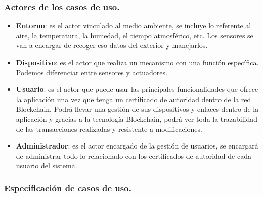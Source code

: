 \subsubsection{Actores de los casos de uso.}

\begin{itemize}
    \item \textbf{Entorno}: es el actor vinculado al medio ambiente, se incluye lo referente al aire, la temperatura, la humedad,
    el tiempo atmosférico, etc. Los sensores se van a encargar de recoger eso datos del exterior y manejarlos.
    \item \textbf{Dispositivo}: es el actor que realiza un mecanismo con una función específica. Podemos diferenciar entre sensores
    y actuadores.
    \item \textbf{Usuario}: es el actor que puede usar las principales funcionalidades que ofrece la aplicación una vez que 
    tenga un certificado de autoridad dentro de la red Blockchain. Podrá llevar una gestión de sus dispositivos y enlaces dentro
    de la aplicación y gracias a la tecnología Blockchain, podrá ver toda la trazabilidad de las transacciones realizadas y 
    resistente a modificaciones.
    \item \textbf{Administrador}: es el actor encargado de la gestión de usuarios, se encargará de administrar todo lo relacionado
    con los certificados de autoridad de cada usuario del sistema.
\end{itemize}

\subsubsection{Especificación de casos de uso.}

